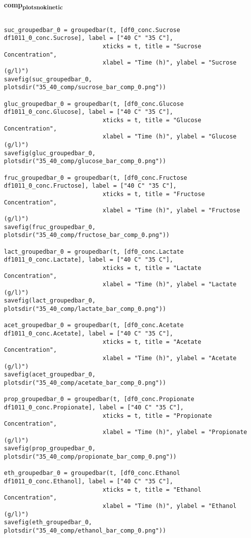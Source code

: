 \documentclass[11pt]{article}
\begin{document}
\textbf{comp\textsubscript{plots}\textsubscript{no}\textsubscript{kinetic}}
\begin{verbatim}

suc_groupedbar_0 = groupedbar(t, [df0_conc.Sucrose df1011_0_conc.Sucrose], label = ["40 C" "35 C"],
                            xticks = t, title = "Sucrose Concentration",
                            xlabel = "Time (h)", ylabel = "Sucrose (g/l)")
savefig(suc_groupedbar_0, plotsdir("35_40_comp/sucrose_bar_comp_0.png"))

gluc_groupedbar_0 = groupedbar(t, [df0_conc.Glucose df1011_0_conc.Glucose], label = ["40 C" "35 C"],
                            xticks = t, title = "Glucose Concentration",
                            xlabel = "Time (h)", ylabel = "Glucose (g/l)")
savefig(gluc_groupedbar_0, plotsdir("35_40_comp/glucose_bar_comp_0.png"))

fruc_groupedbar_0 = groupedbar(t, [df0_conc.Fructose df1011_0_conc.Fructose], label = ["40 C" "35 C"],
                            xticks = t, title = "Fructose Concentration",
                            xlabel = "Time (h)", ylabel = "Fructose (g/l)")
savefig(fruc_groupedbar_0, plotsdir("35_40_comp/fructose_bar_comp_0.png"))

lact_groupedbar_0 = groupedbar(t, [df0_conc.Lactate df1011_0_conc.Lactate], label = ["40 C" "35 C"],
                            xticks = t, title = "Lactate Concentration",
                            xlabel = "Time (h)", ylabel = "Lactate (g/l)")
savefig(lact_groupedbar_0, plotsdir("35_40_comp/lactate_bar_comp_0.png"))

acet_groupedbar_0 = groupedbar(t, [df0_conc.Acetate df1011_0_conc.Acetate], label = ["40 C" "35 C"],
                            xticks = t, title = "Acetate Concentration",
                            xlabel = "Time (h)", ylabel = "Acetate (g/l)")
savefig(acet_groupedbar_0, plotsdir("35_40_comp/acetate_bar_comp_0.png"))

prop_groupedbar_0 = groupedbar(t, [df0_conc.Propionate df1011_0_conc.Propionate], label = ["40 C" "35 C"],
                            xticks = t, title = "Propionate Concentration",
                            xlabel = "Time (h)", ylabel = "Propionate (g/l)")
savefig(prop_groupedbar_0, plotsdir("35_40_comp/propionate_bar_comp_0.png"))

eth_groupedbar_0 = groupedbar(t, [df0_conc.Ethanol df1011_0_conc.Ethanol], label = ["40 C" "35 C"],
                            xticks = t, title = "Ethanol Concentration",
                            xlabel = "Time (h)", ylabel = "Ethanol (g/l)")
savefig(eth_groupedbar_0, plotsdir("35_40_comp/ethanol_bar_comp_0.png"))


\end{verbatim}
\end{document}
